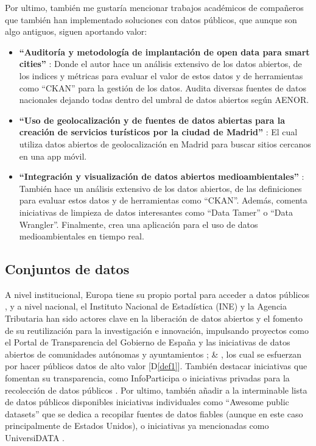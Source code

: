 	Por ultimo, también me gustaría mencionar trabajos académicos de compañeros que también han implementado soluciones con datos públicos, que aunque son algo antiguos, siguen aportando valor:
	
	\begin{itemize}
			\item \textbf{``Auditoría y metodología de implantación de open data para smart cities''} \citep{MelendrezMoreto2016Auditoria}: Donde el autor hace un análisis extensivo de los datos abiertos, de los indices y métricas para evaluar el valor de estos datos y de herramientas como ``CKAN'' para la gestión de los datos. Audita diversas fuentes de datos nacionales dejando todas dentro del umbral de datos abiertos según AENOR. 
			
			\item \textbf{``Uso de geolocalización y de fuentes de datos abiertas para la creación de servicios turísticos por la ciudad de Madrid''} \citep{LLamoccaPortela2016Integracion}: El cual utiliza datos abiertos de geolocalización en Madrid para buscar sitios cercanos en una app móvil.
			
			\item \textbf{``Integración y visualización de datos abiertos medioambientales''} \citep{ArellanoBruno2019UsoDeGeolocalizacion}: También hace un análisis extensivo de los datos abiertos, de las definiciones para evaluar estos datos y de herramientas como ``CKAN''. Además, comenta iniciativas de limpieza de datos interesantes como ``Data Tamer'' o ``Data Wrangler''. Finalmente, crea una aplicación para el uso de datos medioambientales en tiempo real.
	\end{itemize}
	
	\subsection{Conjuntos de datos}
	
	A nivel institucional, Europa tiene su propio portal para acceder a datos públicos \citep{PortalDatosEuropa}, y a nivel nacional, el Instituto Nacional de Estadística (INE) y la Agencia Tributaria han sido actores clave en la liberación de datos abiertos y el fomento de su reutilización para la investigación e innovación, impulsando proyectos como el Portal de Transparencia del Gobierno de España y las iniciativas de datos abiertos de comunidades autónomas y ayuntamientos \citep{PortalDatosGob}; \citep{PortalDatosMadrid} \& \citep{PortalRegistradores}, los cual se esfuerzan por hacer públicos datos de alto valor [D\ref{def1}]. También destacar iniciativas que fomentan su transparencia, como InfoParticipa \citep{PortalInfoparticipa} o iniciativas privadas para la recolección de datos públicos \citep{PortalEsriEspanna}. Por ultimo, también añadir a la interminable lista de datos públicos disponibles iniciativas individuales como ``Awesome public datasets'' \citep{awesomePublicDatasets} que se dedica a recopilar fuentes de datos fiables (aunque en este caso principalmente de Estados Unidos), o iniciativas ya mencionadas como UniversiDATA \citep{UniversiDATA}.
	
